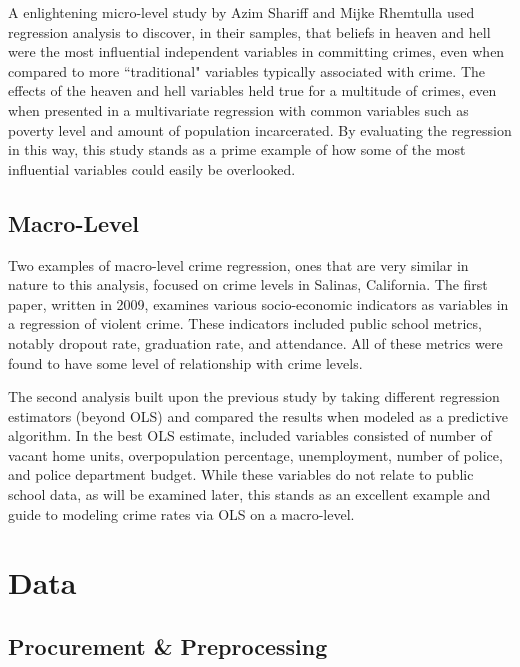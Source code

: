 \documentclass[12pt]{article}
\begin{document}
\par

A enlightening micro-level study by Azim Shariff and Mijke Rhemtulla used regression analysis to discover, in their samples, that beliefs in heaven and hell were the most influential independent variables in committing crimes, even when compared to more ``traditional" variables typically associated with crime.\cite{shariff}  The effects of the heaven and hell variables held true for a multitude of crimes, even when presented in a multivariate regression with common variables such as poverty level and amount of population incarcerated.  By evaluating the regression in this way, this study stands as a prime example of how some of the most influential variables could easily be overlooked.

\subsection{Macro-Level}

Two examples of macro-level crime regression, ones that are very similar in nature to this analysis, focused on crime levels in Salinas, California.  The first paper, written in 2009, examines various socio-economic indicators as variables in a regression of violent crime.  These indicators included public school metrics, notably dropout rate, graduation rate, and attendance.  All of these metrics were found to have some level of relationship with crime levels.\cite{salinas_env}

\par

The second analysis built upon the previous study by taking different regression estimators (beyond OLS) and compared the results when modeled as a predictive algorithm.  In the best OLS estimate, included variables consisted of number of vacant home units, overpopulation percentage, unemployment, number of police, and police department budget.\cite{salinas_crime}  While these variables do not relate to public school data, as will be examined later, this stands as an excellent example and guide to modeling crime rates via OLS on a macro-level.

	\section{Data}


\subsection{Procurement \& Preprocessing}
\end{document}
